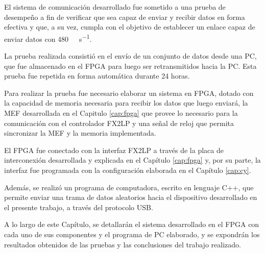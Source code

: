 

El sistema de comunicación desarrollado fue sometido a una prueba de desempeño a fin de verificar que sea capaz de enviar y recibir datos en forma efectiva y que, a su vez, cumpla con el objetivo de establecer un enlace capaz de enviar datos con \SI{480}{\mega\bit\per\second}.

La prueba realizada consistió en el envío de un conjunto de datos desde una PC, que fue almacenado en el FPGA para luego ser retransmitidos hacia la PC. Esta prueba fue repetida en forma automática durante 24 horas.

Para realizar la prueba fue necesario elaborar un sistema en FPGA, dotado con la capacidad de memoria necesaria para recibir los datos que luego enviará, la MEF desarrollada en el Capitulo \ref{cap:fpga} que provee lo necesario para la comunicación con el controlador FX2LP y una señal de reloj que permita sincronizar la MEF y la memoria implementada.

El FPGA fue conectado con la interfaz FX2LP a través de la placa de interconexión desarrollada y explicada en el Capítulo \ref{cap:fpga} y, por su parte, la interfaz fue programada con la configuración elaborada en el Capítulo \ref{cap:cy}.

Además, se realizó un programa de computadora, escrito en lenguaje C++, que permite enviar una trama de datos aleatorios hacia el dispositivo desarrollado en el presente trabajo, a través del protocolo USB.

A lo largo de este Capítulo, se detallarán el sistema desarrollado en el FPGA con cada uno de sus componentes y el programa de PC elaborado, y se expondrán los resultados obtenidos de las pruebas y las conclusiones del trabajo realizado.